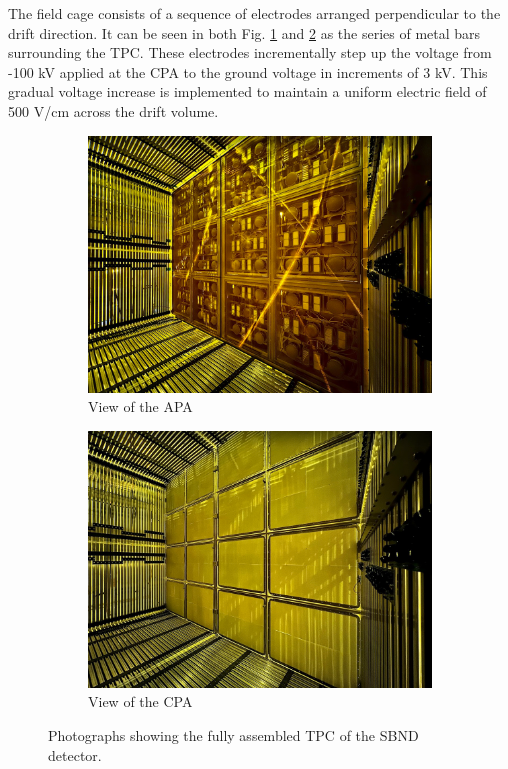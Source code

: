 The field cage consists of a sequence of electrodes arranged perpendicular to the drift direction.
It can be seen in both Fig. \ref{fig:SBND_APA} and \ref{fig:SBND_CPA} as the series of metal bars surrounding the TPC.
These electrodes incrementally step up the voltage from -100 kV applied at the CPA to the ground voltage in increments of 3 kV. 
This gradual voltage increase is implemented to maintain a uniform electric field of 500 V/cm across the drift volume.

\begin{figure}[htbp!]
\begin{subfigure}[h]{0.5\linewidth}
\centering    
\includegraphics[width=\linewidth]{SBND_APA_PDS}
\caption{View of the APA}
\label{fig:SBND_APA}
\end{subfigure}%
\hfill
\begin{subfigure}[h]{0.5\linewidth}
\centering    
\includegraphics[width=\linewidth]{SBND_CPA}
\caption{View of the CPA}
\label{fig:SBND_CPA}
\end{subfigure}
\caption[SBND Time Projection Chamber Photographs]{
Photographs showing the fully assembled TPC of the SBND detector. 
}
\label{fig:SBND_CPA_APA}
\end{figure}

